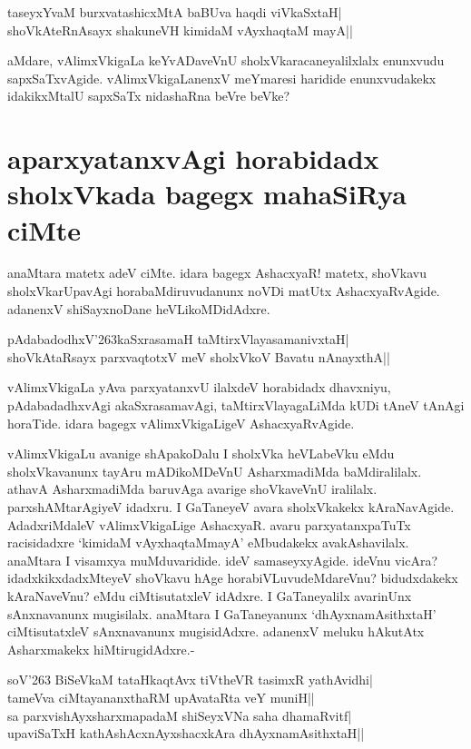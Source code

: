 \begin{shloka} 
taseyxYvaM burxvatashicxMtA baBUva haqdi viVkaSxtaH|\label{201a}\\ 
shoVkAteRnAsayx shakuneVH kimidaM vAyxhaqtaM mayA||
\end{shloka}

aMdare, vAlimxVkigaLa keYvADaveVnU sholxVkaracaneyalilxlalx enunxvudu sapxSaTxvAgide. vAlimxVkigaLanenxV meYmaresi haridide enunxvudakekx idakikxMtalU sapxSaTx nidashaRna beVre beVke? 

\section*{aparxyatanxvAgi horabidadx sholxVkada bagegx mahaSiRya ciMte} 

anaMtara matetx adeV ciMte. idara bagegx AshacxyaR! matetx, shoVkavu sholxVkarUpavAgi horabaMdiruvudanunx noVDi matUtx AshacxyaRvAgide. adanenxV shiSayxnoDane heVLikoMDidAdxre. 

\begin{shloka}
pAdabadodhxV\char'263kaSxrasamaH taMtirxVlayasamanivxtaH|\label{201}\\ 
shoVkAtaRsayx parxvaqtotxV meV sholxVkoV Bavatu nAnayxthA||
\end{shloka}


vAlimxVkigaLa yAva parxyatanxvU ilalxdeV horabidadx dhavxniyu, pAdabadadhxvAgi akaSxrasamavAgi, taMtirxVlayagaLiMda kUDi tAneV tAnAgi horaTide. idara bagegx vAlimxVkigaLigeV AshacxyaRvAgide. 

vAlimxVkigaLu avanige shApakoDalu I sholxVka heVLabeVku eMdu sholxVkavanunx tayAru mADikoMDeVnU AsharxmadiMda baMdiralilalx. athavA AsharxmadiMda baruvAga avarige shoVkaveVnU iralilalx. parxshAMtarAgiyeV idadxru. I GaTaneyeV avara sholxVkakekx kAraNavAgide. AdadxriMdaleV vAlimxVkigaLige AshacxyaR. avaru parxyatanxpaTuTx racisidadxre `kimidaM vAyxhaqtaMmayA' eMbudakekx avakAshavilalx. anaMtara I visamxya muMduvaridide. ideV samaseyxyAgide. ideVnu vicAra? idadxkikxdadxMteyeV shoVkavu hAge horabiVLuvudeMdareVnu? bidudxdakekx kAraNaveVnu? eMdu ciMtisutatxleV idAdxre. I GaTaneyalilx avarinUnx sAnxnavanunx mugisilalx. anaMtara I GaTaneyanunx `dhAyxnamAsithxtaH' ciMtisutatxleV sAnxnavanunx mugisidAdxre. adanenxV meluku hAkutAtx Asharxmakekx hiMtirugidAdxre.- 

\begin{shloka}
soV\char'263 BiSeVkaM tataHkaqtAvx tiVtheVR tasimxR yathAvidhi|\label{201c}\\ 
tameVva ciMtayananxthaRM upAvataRta veY muniH||\\ 
sa parxvishAyxsharxmapadaM shiSeyxVNa saha dhamaRvitf|\label{201b}\\ 
upaviSaTxH kathAshAcxnAyxshacxkAra dhAyxnamAsithxtaH||
\end{shloka}


